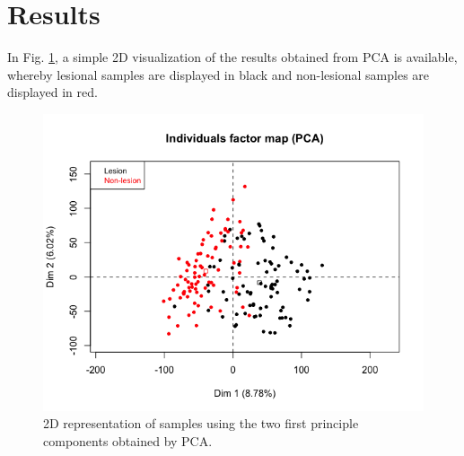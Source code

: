 \documentclass[journal, a4paper]{IEEEtran}
\begin{document}


\section{\textbf{Results}}

In Fig. \ref{fig:pca}, a simple 2D visualization of the results obtained from PCA is available, whereby lesional samples are displayed in black and non-lesional samples are displayed in red.

\begin{figure}[!htp]
    \begin{center}
    \begin{minipage}{0.5 \textwidth}
      \centering
      \includegraphics[width=\textwidth]{../exploratory-data-analysis/pca-plot.png}
      \caption{2D representation of samples using the two first principle components obtained by PCA.}
      \label{fig:pca}
    \end{minipage}
  \end{center}
\end{figure}
\end{document}
